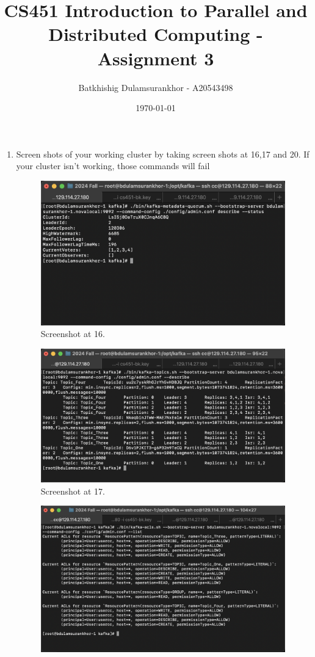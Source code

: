 \documentclass{article}
\title{CS451 Introduction to Parallel and Distributed Computing - Assignment 3}
\author{Batkhishig Dulamsurankhor - A20543498}
\date{\today} %
\begin{document}
\maketitle

\begin{enumerate}
  \item Screen shots of your working cluster by taking screen shots at 16,17 and 20. If your cluster isn't working, those commands will fail
  \begin{figure}[H]
    \includegraphics[width=\textwidth]{image1.png}
    \caption{Screenshot at 16.}
    \centering
  \end{figure}
  \begin{figure}[H]
    \includegraphics[width=\textwidth]{image2.png}
    \caption{Screenshot at 17.}
    \centering
  \end{figure}
  \begin{figure}[H]
    \includegraphics[width=\textwidth]{image3.png}

\end{figure}
\end{enumerate}
\end{document}
